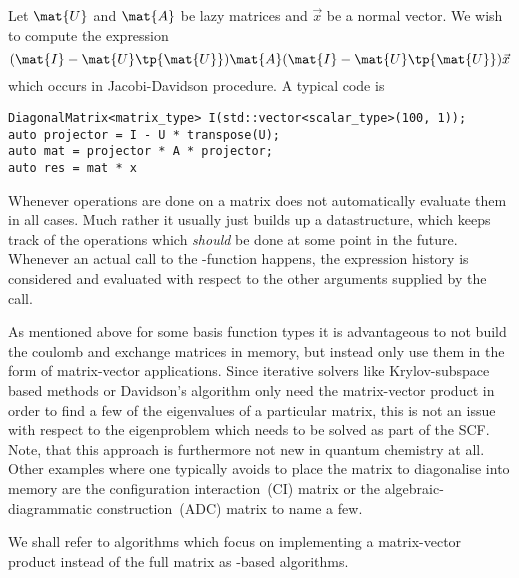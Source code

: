 Let $\mat{U}$ and $\mat{A}$ be lazy matrices and $\vec{x}$ be a normal vector.
We wish to compute the expression
\[ (\mat{I} - \mat{U} \tp{\mat{U}}) \mat{A} (\mat{I} - \mat{U} \tp{\mat{U}}) \vec{x} \]
which occurs in Jacobi-Davidson procedure.
A typical code is
\begin{lstlisting}
DiagonalMatrix<matrix_type> I(std::vector<scalar_type>(100, 1));
auto projector = I - U * transpose(U);
auto mat = projector * A * projector;
auto res = mat * x
\end{lstlisting}




\label{sec:lazymat}

Whenever operations are done on a matrix \lazyten does not automatically
evaluate them in all cases.
Much rather it usually just builds up a datastructure,
which keeps track of the operations which \textit{should} be done
at some point in the future.
Whenever an actual call to the \contraction-function happens,
the expression history is considered and evaluated with respect
to the other arguments supplied by the \contraction call.



As mentioned above for some basis function types it is advantageous
to not build the coulomb and exchange matrices in memory,
but instead only use them in the form of matrix-vector applications.
Since iterative solvers like Krylov-subspace based methods or Davidson's algorithm
only need the matrix-vector product in order to find a few of the eigenvalues
of a particular matrix,
this is not an issue with respect to the eigenproblem which needs to be solved
as part of the SCF.
Note, that this approach is furthermore not new in quantum chemistry at all.
Other examples where one typically avoids to place the matrix to diagonalise
into memory are the configuration interaction~(CI) matrix
or the algebraic-diagrammatic construction~(ADC) matrix to name a few.

We shall refer to algorithms which focus on implementing a matrix-vector product
instead of the full matrix as \contraction-based algorithms.

